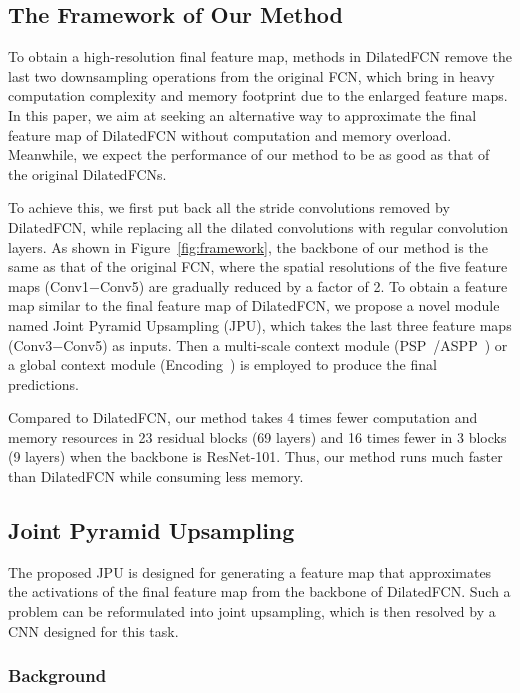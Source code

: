 \documentclass[10pt,twocolumn,letterpaper]{article}
\begin{document}
\subsection{The Framework of Our Method}
To obtain a high-resolution final feature map, methods in DilatedFCN remove the last two downsampling operations from the original FCN, which bring in heavy computation complexity and memory footprint due to the enlarged feature maps.
In this paper, we aim at seeking an alternative way to approximate the final feature map of DilatedFCN without computation and memory overload.
Meanwhile, we expect the performance of our method to be as good as that of the original DilatedFCNs.

To achieve this, we first put back all the stride convolutions removed by DilatedFCN, while replacing all the dilated convolutions with regular convolution layers.
As shown in Figure~\ref{fig:framework}, the backbone of our method is the same as that of the original FCN, where the spatial resolutions of the five feature maps (Conv1$-$Conv5) are gradually reduced by a factor of 2.
To obtain a feature map similar to the final feature map of DilatedFCN, we propose a novel module named Joint Pyramid Upsampling (JPU), which takes the last three feature maps (Conv3$-$Conv5) as inputs.
Then a multi-scale context module (PSP~\cite{zhao2017pyramid}/ASPP~\cite{chen2017rethinking}) or a global context module (Encoding~\cite{zhang2018context}) is employed to produce the final predictions.
 
Compared to DilatedFCN, our method takes 4 times fewer computation and memory resources in 23 residual blocks (69 layers) and 16 times fewer in 3 blocks (9 layers) when the backbone is ResNet-101.
Thus, our method runs much faster than DilatedFCN while consuming less memory.
\subsection{Joint Pyramid Upsampling}
The proposed JPU is designed for generating a feature map that approximates the activations of the final feature map from the backbone of DilatedFCN.
Such a problem can be reformulated into joint upsampling, which is then resolved by a CNN designed for this task.
\subsubsection{Background}
\end{document}
